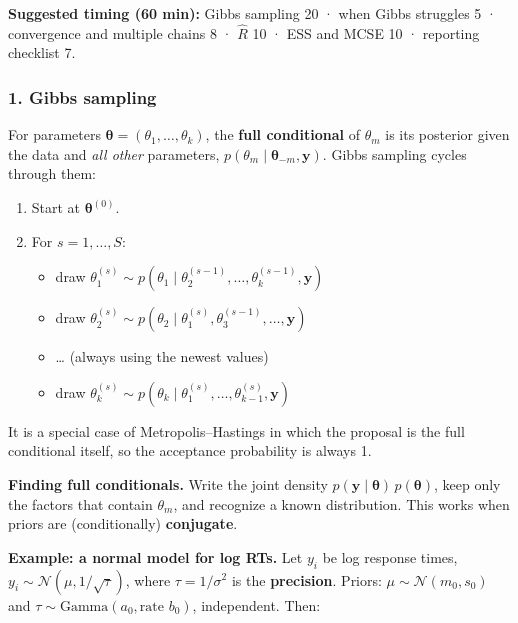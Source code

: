 \textbf{Suggested timing (60 min):} Gibbs sampling 20 · when Gibbs
struggles 5 · convergence and multiple chains 8 · \(\hat R\) 10 · ESS
and MCSE 10 · reporting checklist 7.

\subsubsection{1. Gibbs sampling}

For parameters \(\boldsymbol\theta = (\theta_1, \dots, \theta_k)\), the
\textbf{full conditional} of \(\theta_m\) is its posterior given the
data and \emph{all other} parameters,
\(p(\theta_m \mid \boldsymbol\theta_{-m}, \mathbf{y})\). Gibbs sampling
cycles through them:

\begin{enumerate}
\def\labelenumi{\arabic{enumi}.}
\tightlist
\item
  Start at \(\boldsymbol\theta^{(0)}\).
\item
  For \(s = 1, \dots, S\):

  \begin{itemize}
  \tightlist
  \item
    draw
    \(\theta_1^{(s)} \sim p(\theta_1 \mid \theta_2^{(s-1)}, \dots, \theta_k^{(s-1)}, \mathbf{y})\)
  \item
    draw
    \(\theta_2^{(s)} \sim p(\theta_2 \mid \theta_1^{(s)}, \theta_3^{(s-1)}, \dots, \mathbf{y})\)
  \item
    \ldots{} (always using the newest values)
  \item
    draw
    \(\theta_k^{(s)} \sim p(\theta_k \mid \theta_1^{(s)}, \dots, \theta_{k-1}^{(s)}, \mathbf{y})\)
  \end{itemize}
\end{enumerate}

It is a special case of Metropolis--Hastings in which the proposal is
the full conditional itself, so the acceptance probability is always 1.

\textbf{Finding full conditionals.} Write the joint density
\(p(\mathbf{y}\mid\boldsymbol\theta)\,p(\boldsymbol\theta)\), keep only
the factors that contain \(\theta_m\), and recognize a known
distribution. This works when priors are (conditionally)
\textbf{conjugate}.

\textbf{Example: a normal model for log RTs.} Let \(y_i\) be log
response times, \(y_i \sim \mathcal{N}(\mu, 1/\sqrt{\tau})\), where
\(\tau = 1/\sigma^2\) is the \textbf{precision}. Priors:
\(\mu \sim \mathcal{N}(m_0, s_0)\) and
\(\tau \sim \mathrm{Gamma}(a_0, \text{rate } b_0)\), independent. Then:

